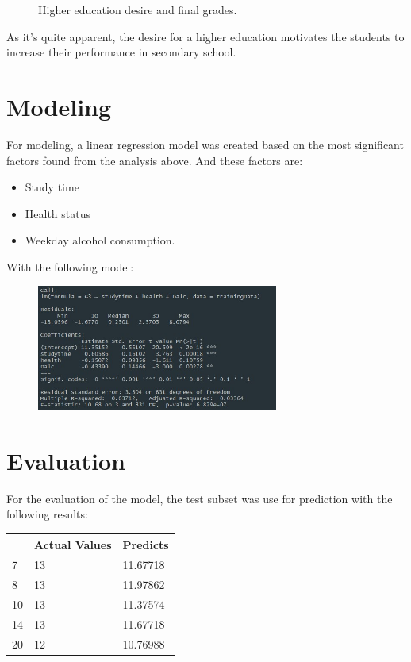 \documentclass[a4paper, 11pt]{article}
\begin{document}
\begin{figure}[h!]
\begin{subfigure}[b]{0.2\linewidth}
		\end{subfigure}
		\caption*{Higher education desire and final grades.}
		\label{fig:higher_grades}
	\end{figure}
	
	As it's quite apparent, the desire for a higher education motivates the students to increase their performance in secondary school.
	
	
	\section{Modeling}
	
	For modeling, a linear regression model was created based on the most significant factors found from the analysis above. And these factors are: 
	\begin{itemize}
		\item Study time
		\item Health status
		\item Weekday alcohol consumption.
	\end{itemize}

	With the following model:
	
	\begin{center}
		\begin{figure}[H]
			\hspace*{1.2in}
			\vspace*{-0.5in}
			\includegraphics[width=300px]{model.jpeg}
			\label{fig:model}
		\end{figure}
	\end{center}

	\section{Evaluation}
	
	For the evaluation of the model, the test subset was use for prediction with the following results:
	
	\begin{table}[H]
		\centering
		\begin{tabular}{|l|l|l|}
			\hline
			& Actual Values & Predicts \\ \hline
			7  & 13            & 11.67718 \\ \hline
			8  & 13            & 11.97862 \\ \hline
			10 & 13            & 11.37574 \\ \hline
			14 & 13            & 11.67718 \\ \hline
			20 & 12            & 10.76988 \\ \hline
		\end{tabular}
	\end{table}
	
	
	
\end{document}
